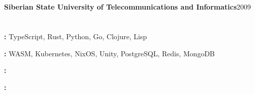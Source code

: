 \documentclass[11pt,a4paper]{article}
\newcommand{\header}[2]
	{\textbf{#1}\hfill\small{#2}\normalsize\par\vspace{-0.4em}}
\newcommand{\subheader}[2]
	{\small\textit{#1}\hfill\textit{#2}\normalsize\vspace{-0.4em}}
\newcommand{\simplelist}[2]
	{\small\textbf{#1:} {#2}\normalsize\par\vspace{-0.4em}}
\begin{document}
	\section{\strSectionEducation}

	\header{Siberian State University of Telecommunications and Informatics}{2009}
	\subheader{\strEducationDegree}{\strLocNovosibirsk}

	\section{\strSectionSkillsInterests}
	\simplelist{\strLabelProgrammingLanguages}{TypeScript, Rust, Python, Go, Clojure, Lisp}
	\simplelist{\strLabelTech}{WASM, Kubernetes, NixOS, Unity, PostgreSQL, Redis, MongoDB}
	\simplelist{\strLabelSpokenLanguages}{\strSpokenLanguagesList}
	\simplelist{\strLabelInterests}{\strInterestsList}
\end{document}
